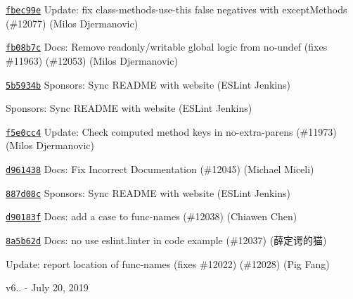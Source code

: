 \begin{DoxyItemize}
\item \href{https://github.com/eslint/eslint/commit/fbec99ea3e39316791685652c66e522d698f52d8}{\texttt{ {\ttfamily fbec99e}}} Update\+: fix class-\/methods-\/use-\/this false negatives with except\+Methods (\#12077) (Milos Djermanovic)
\item \href{https://github.com/eslint/eslint/commit/fb08b7c9d28bc68864eb940e26df274059228b6a}{\texttt{ {\ttfamily fb08b7c}}} Docs\+: Remove readonly/writable global logic from no-\/undef (fixes \#11963) (\#12053) (Milos Djermanovic)
\item \href{https://github.com/eslint/eslint/commit/5b5934b9513f9114f5bf8e12ff4f4981590d64d3}{\texttt{ {\ttfamily 5b5934b}}} Sponsors\+: Sync R\+E\+A\+D\+ME with website (E\+S\+Lint Jenkins)
\item \href{https://github.com/eslint/eslint/commit/915676022a100ae5dba788fa3329d34b3c1f18d3}{\texttt{ {}}} Sponsors\+: Sync R\+E\+A\+D\+ME with website (E\+S\+Lint Jenkins)
\item \href{https://github.com/eslint/eslint/commit/f5e0cc40795f175692acb05daaadb91e9e5ae5d3}{\texttt{ {\ttfamily f5e0cc4}}} Update\+: Check computed method keys in no-\/extra-\/parens (\#11973) (Milos Djermanovic)
\item \href{https://github.com/eslint/eslint/commit/d9614388df8cfb977842ed7ac4725d76a3e05df3}{\texttt{ {\ttfamily d961438}}} Docs\+: Fix Incorrect Documentation (\#12045) (Michael Miceli)
\item \href{https://github.com/eslint/eslint/commit/887d08c244e32f1fc18359e63380e2cdb0cb3797}{\texttt{ {\ttfamily 887d08c}}} Sponsors\+: Sync R\+E\+A\+D\+ME with website (E\+S\+Lint Jenkins)
\item \href{https://github.com/eslint/eslint/commit/d90183ff6757cff854f4ca4d25b835143dfb4b21}{\texttt{ {\ttfamily d90183f}}} Docs\+: add a case to func-\/names (\#12038) (Chiawen Chen)
\item \href{https://github.com/eslint/eslint/commit/8a5b62de2ae574f416c0f8ad91205da9b1837275}{\texttt{ {\ttfamily 8a5b62d}}} Docs\+: no use eslint.\+linter in code example (\#12037) (薛定谔的猫)
\item \href{https://github.com/eslint/eslint/commit/58317673210e48be3975e317c2c566fae155c94f}{\texttt{ {}}} Update\+: report location of func-\/names (fixes \#12022) (\#12028) (Pig Fang)
\end{DoxyItemize}

v6.. -\/ July 20, 2019



